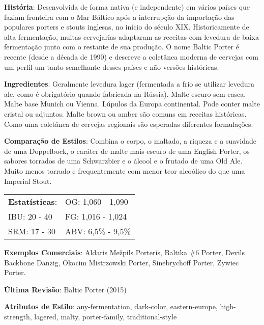 \textbf{História}: Desenvolvida de forma nativa (e independente) em vários países que faziam fronteira com o Mar Báltico após a interrupção da importação das populares porters e stouts inglesas, no início do século XIX. Historicamente de alta fermentação, muitas cervejarias adaptaram as receitas com levedura de baixa fermentação junto com o restante de sua produção. O nome Baltic Porter é recente (desde a década de 1990) e descreve a coletânea moderna de cervejas com um perfil um tanto semelhante desses países e não versões históricas.

\textbf{Ingredientes}: Geralmente levedura lager (fermentada a frio se utilizar levedura ale, como é obrigatório quando fabricada na Rússia). Malte escuro sem casca. Malte base Munich ou Vienna. Lúpulos da Europa continental. Pode conter malte cristal ou adjuntos. Malte brown ou amber são comuns em receitas históricas. Como uma coletânea de cervejas regionais são esperadas diferentes formulações.

\textbf{Comparação de Estilos}: Combina o corpo, o maltado, a riqueza e a suavidade de uma Doppelbock, o caráter de malte mais escuro de uma English Porter, os sabores torrados de uma Schwarzbier e o álcool e o frutado de uma Old Ale. Muito menos torrado e frequentemente com menor teor alcoólico do que uma Imperial Stout.

\begin{tabular}{@{}p{35mm}p{35mm}@{}}
  \textbf{Estatísticas}: & OG: 1,060 - 1,090 \\
  IBU: 20 - 40 & FG: 1,016 - 1,024 \\
  SRM: 17 - 30 & ABV: 6,5\% - 9,5\%
\end{tabular}

\textbf{Exemplos Comerciais}: Aldaris Mežpils Porteris, Baltika \#6 Porter, Devils Backbone Danzig, Okocim Mistrzowski Porter, Sinebrychoff Porter, Zywiec Porter.

\textbf{Última Revisão}: Baltic Porter (2015)

\textbf{Atributos de Estilo}: any-fermentation, dark-color, eastern-europe, high-strength, lagered, malty, porter-family, traditional-style

